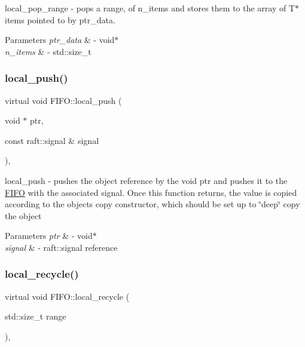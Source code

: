 local\+\_\+pop\+\_\+range -\/ pops a range, of n\+\_\+items and stores them to the array of T$\ast$ items pointed to by ptr\+\_\+data. 
\begin{DoxyParams}{Parameters}
{\em ptr\+\_\+data} & -\/ void$\ast$ \\
\hline
{\em n\+\_\+items} & -\/ std\+::size\+\_\+t \\
\hline
\end{DoxyParams}
\hypertarget{class_f_i_f_o_a4ef48ce2cb02e8bd5d381bb65687e6cb}{}\label{class_f_i_f_o_a4ef48ce2cb02e8bd5d381bb65687e6cb} 
\subsubsection{\texorpdfstring{local\+\_\+push()}{local\_push()}}
{\footnotesize\ttfamily virtual void F\+I\+F\+O\+::local\+\_\+push (\begin{DoxyParamCaption}\item[{void $\ast$}]{ptr,  }\item[{const raft\+::signal \&}]{signal }\end{DoxyParamCaption})\hspace{0.3cm}{\ttfamily [protected]}, {}}

local\+\_\+push -\/ pushes the object reference by the void ptr and pushes it to the \hyperlink{class_f_i_f_o}{F\+I\+FO} with the associated signal. Once this function returns, the value is copied according to the objects copy constructor, which should be set up to \char`\"{}deep\char`\"{} copy the object 
\begin{DoxyParams}{Parameters}
{\em ptr} & -\/ void$\ast$ \\
\hline
{\em signal} & -\/ raft\+::signal reference \\
\hline
\end{DoxyParams}
\hypertarget{class_f_i_f_o_a72ba5eed0ad96d6f65414f1070a2ac37}{}\label{class_f_i_f_o_a72ba5eed0ad96d6f65414f1070a2ac37} 
\subsubsection{\texorpdfstring{local\+\_\+recycle()}{local\_recycle()}}
{\footnotesize\ttfamily virtual void F\+I\+F\+O\+::local\+\_\+recycle (\begin{DoxyParamCaption}\item[{std\+::size\+\_\+t}]{range }\end{DoxyParamCaption})\hspace{0.3cm}{\ttfamily [protected]}, {}}

